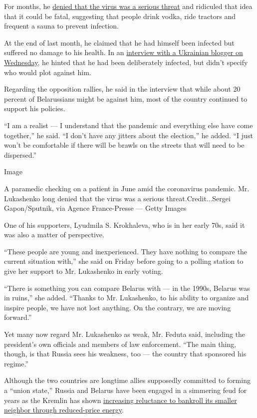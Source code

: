 For months, he
\href{https://www.nytimes.com/2020/04/25/world/europe/belarus-lukashenko-coronavirus.html}{denied
that the virus was a serious threat} and ridiculed that idea that it
could be fatal, suggesting that people drink vodka, ride tractors and
frequent a sauna to prevent infection.

At the end of last month, he claimed that he had himself been infected
but suffered no damage to his health. In an
\href{https://www.youtube.com/watch?v=R5UmsPFMUaw\&t=3067s}{interview
with a Ukrainian blogger on Wednesday}, he hinted that he had been
deliberately infected, but didn't specify who would plot against him.

Regarding the opposition rallies, he said in the interview that while
about 20 percent of Belarussians might be against him, most of the
country continued to support his policies.

``I am a realist --- I understand that the pandemic and everything else
have come together,'' he said. ``I don't have any jitters about the
election,'' he added. ``I just won't be comfortable if there will be
brawls on the streets that will need to be dispersed.''

Image

A paramedic checking on a patient in June amid the coronavirus pandemic.
Mr. Lukashenko long denied that the virus was a serious
threat.Credit...Sergei Gapon/Sputnik, via Agence France-Presse --- Getty
Images

One of his supporters, Lyudmila S. Krokhaleva, who is in her early 70s,
said it was also a matter of perspective.

``These people are young and inexperienced. They have nothing to compare
the current situation with,'' she said on Friday before going to a
polling station to give her support to Mr. Lukashenko in early voting.

``There is something you can compare Belarus with --- in the 1990s,
Belarus was in ruins,'' she added. ``Thanks to Mr. Lukashenko, to his
ability to organize and inspire people, we have not lost anything. On
the contrary, we are moving forward.''

Yet many now regard Mr. Lukashenko as weak, Mr. Feduta said, including
the president's own officials and members of law enforcement. ``The main
thing, though, is that Russia sees his weakness, too --- the country
that sponsored his regime.''

Although the two countries are longtime allies supposedly committed to
forming a ``union state,'' Russia and Belarus have been engaged in a
simmering feud for years as the Kremlin has shown
\href{https://www.nytimes.com/2020/02/07/world/europe/belarus-lukashenko-russia-putin.html}{increasing
reluctance to bankroll its smaller neighbor through reduced-price
energy}.

